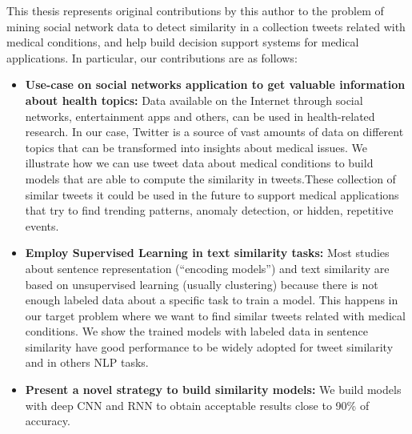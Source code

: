\documentclass[12pt]{report}
\begin{document}
			This thesis represents original contributions by this author to the problem of mining social network data to detect similarity in a collection tweets related with medical conditions, and help build
	decision support systems for medical applications. In particular, our contributions are as follows:
	
	\begin{itemize}[nolistsep]
			
		\item \textbf{Use-case on social networks application to get valuable information about health topics:}  Data available on the Internet through social networks, entertainment apps and others, can be used in health-related research. In our case,  Twitter is a source of vast amounts of data on different topics that can be transformed into insights about  medical issues. We illustrate  how we can use tweet data about medical conditions to build models that are able to compute the similarity in tweets.These collection of similar tweets  it could be used in the future to support medical applications that try to find trending patterns, 
		anomaly detection, or hidden, repetitive events. 
		\item \textbf{Employ Supervised Learning in text similarity tasks:} Most studies about sentence representation (``encoding models'') and text similarity are based on unsupervised learning (usually clustering) because there is not enough labeled data about a specific task to train a model. This happens in our target problem where we want to find similar tweets related with medical conditions. We show the trained models with labeled data in sentence similarity have good performance to be widely adopted for tweet similarity and in others \ac{NLP} tasks.
		\item \textbf{Present a novel strategy to build similarity models: } We build models with deep \ac{CNN} and \ac{RNN} to obtain acceptable results close to 90\% of accuracy. 

\end{itemize}
\end{document}
